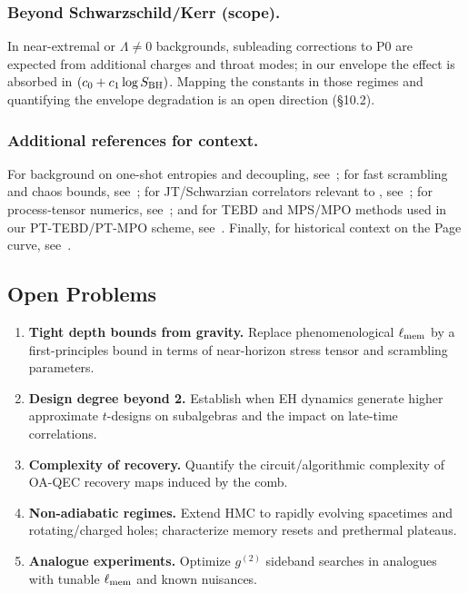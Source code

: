 \documentclass[aps,prd,preprint,onecolumn,superscriptaddress,nofootinbib,longbibliography,floatfix,11pt,showpacs,showkeys]{revtex4-2}
\newcommand{\HMC}{\textsc{HMC}\xspace}
\newcounter{algorithm}
\theoremstyle{plain}
\theoremstyle{definition}
\theoremstyle{remark}
\begin{document}
\subsubsection{Beyond Schwarzschild/Kerr (scope).}
In near-extremal or $\Lambda\!\ne\!0$ backgrounds, subleading corrections to
P0 are expected from additional charges and throat modes; in our envelope the
effect is absorbed in $(c_0+c_1\log S_{\rm BH})$.
Mapping the constants in those regimes and quantifying the envelope degradation
is an open direction (§10.2).

\subsubsection{Additional references for context.} For background on one-shot entropies and decoupling, see~\cite{Horodecki:2009}; for fast scrambling and chaos bounds, see~\cite{Sekino:2008,Maldacena:2016}; for JT/Schwarzian correlators relevant to , see~\cite{StanfordWitten:2017}; for process-tensor numerics, see~\cite{Strathearn:2018}; and for TEBD and MPS/MPO methods used in our PT-TEBD/PT-MPO scheme, see~\cite{Vidal:2003,Vidal:2004}. Finally, for historical context on the Page curve, see~\cite{Page:1976}.

\subsection*{Open Problems}
\begin{enumerate}[leftmargin=*]
\item \textbf{Tight depth bounds from gravity.} Replace phenomenological $\ell_{\rm mem}$ by a first-principles bound in terms of near-horizon stress tensor and scrambling parameters.
\item \textbf{Design degree beyond 2.} Establish when EH dynamics generate higher approximate $t$-designs on subalgebras and the impact on late-time correlations.
\item \textbf{Complexity of recovery.} Quantify the circuit/algorithmic complexity of OA-QEC recovery maps induced by the comb.
\item \textbf{Non-adiabatic regimes.} Extend \HMC{} to rapidly evolving spacetimes and rotating/charged holes; characterize memory resets and prethermal plateaus.
\item \textbf{Analogue experiments.} Optimize $g^{(2)}$ sideband searches in analogues with tunable $\ell_{\rm mem}$ and known nuisances.
\end{enumerate}
\end{document}
